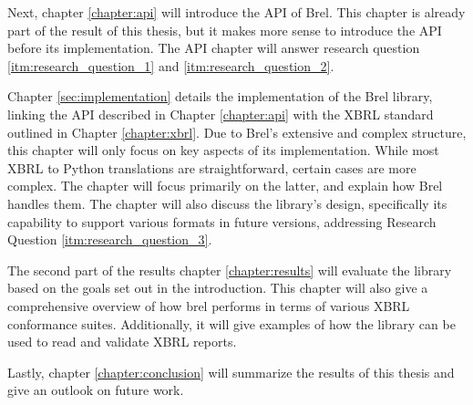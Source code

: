 Next, chapter \ref{chapter:api} will introduce the API of Brel.
This chapter is already part of the result of this thesis, but it makes more sense to introduce the API before its implementation.
The API chapter will answer research question \ref{itm:research_question_1} and \ref{itm:research_question_2}.

Chapter \ref{sec:implementation} details the implementation of the Brel library, 
linking the API described in Chapter \ref{chapter:api} with the XBRL standard outlined in Chapter \ref{chapter:xbrl}. 
Due to Brel's extensive and complex structure, this chapter will only focus on key aspects of its implementation. 
While most XBRL to Python translations are straightforward, certain cases are more complex. 
The chapter will focus primarily on the latter, and explain how Brel handles them. 
The chapter will also discuss the library's design, specifically its capability to support various formats in future versions, 
addressing Research Question \ref{itm:research_question_3}.

The second part of the results chapter \ref{chapter:results} will evaluate the library based on the goals set out in the introduction.
This chapter will also give a comprehensive overview of how brel performs in terms of various XBRL conformance suites.
Additionally, it will give examples of how the library can be used to read and validate XBRL reports.

Lastly, chapter \ref{chapter:conclusion} will summarize the results of this thesis and give an outlook on future work.
